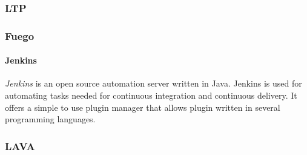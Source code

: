 \documentclass{article}
\begin{document}
		\subsubsection{LTP}
		\subsubsection{Fuego}
			\paragraph{Jenkins}
				\emph{Jenkins} is an open source automation server written in Java. Jenkins is used for automating tasks needed for continuous integration and continuous delivery. It offers a simple to use plugin manager that allows plugin written in several programming languages.
		\subsubsection{LAVA}
\end{document}
